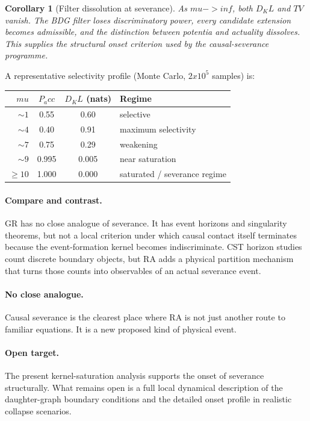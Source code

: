 \documentclass[11pt]{article}
\def\mu{mu}%
\def\mathrm#1{#1}%
\def\times{x}%
\def\to{->}%
\def\infty{inf}%
\def\Pacc{P_acc}%
\def\Dkl{D_KL}%
\def\TV{TV}%
\newtheorem{corollary}{Corollary}
\newcommand{\Pacc}{\ensuremath{P_{\mathrm{acc}}}}
\newcommand{\Dkl}{\ensuremath{D_{\mathrm{KL}}}}
\newcommand{\TV}{\ensuremath{\mathrm{TV}}}
\begin{document}
\begin{corollary}[Filter dissolution at severance]
As $\mu\to\infty$, both $\Dkl$ and $\TV$ vanish. The BDG filter loses discriminatory power, every candidate extension becomes admissible, and the distinction between potentia and actuality dissolves. This supplies the structural onset criterion used by the causal-severance programme.
\end{corollary}

A representative selectivity profile (Monte Carlo, $2\times 10^5$ samples) is:

\begin{center}
\begin{tabular}{rccl}
\toprule
$\mu$ & $\Pacc$ & $\Dkl$ (nats) & Regime \\
\midrule
$\sim 1$ & 0.55 & 0.60 & selective \\
$\sim 4$ & 0.40 & 0.91 & maximum selectivity \\
$\sim 7$ & 0.75 & 0.29 & weakening \\
$\sim 9$ & 0.995 & 0.005 & near saturation \\
$\ge 10$ & 1.000 & 0.000 & saturated / severance regime \\
\bottomrule
\end{tabular}
\end{center}

\paragraph{Compare and contrast.} GR has no close analogue of severance. It has event horizons and singularity theorems, but not a local criterion under which causal contact itself terminates because the event-formation kernel becomes indiscriminate. CST horizon studies count discrete boundary objects, but RA adds a physical partition mechanism that turns those counts into observables of an actual severance event.

\paragraph{No close analogue.} Causal severance is the clearest place where RA is not just another route to familiar equations. It is a new proposed kind of physical event.

\paragraph{Open target.} The present kernel-saturation analysis supports the onset of severance structurally. What remains open is a full local dynamical description of the daughter-graph boundary conditions and the detailed onset profile in realistic collapse scenarios.
\end{document}
